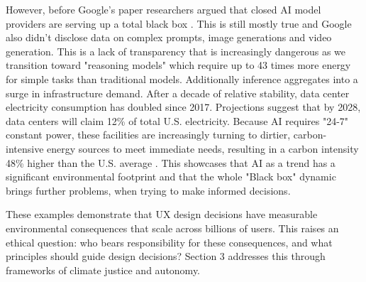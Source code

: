 \par However, before Google's paper researchers argued that closed AI model providers are serving up a total black box . This is still mostly true and Google also didn't disclose data on complex prompts, image generations and video generation. This is a lack of transparency that is increasingly dangerous as we transition toward "reasoning models" which require up to 43 times more energy for simple tasks than traditional models. Additionally inference aggregates into a surge in infrastructure demand. After a decade of relative stability, data center electricity consumption has doubled since 2017. Projections suggest that by 2028, data centers will claim 12\% of total U.S. electricity. Because AI requires "24-7" constant power, these facilities are increasingly turning to dirtier, carbon-intensive energy sources to meet immediate needs, resulting in a carbon intensity 48\% higher than the U.S. average \cite{MIT}. This showcases that AI as a trend has a significant environmental footprint and that the whole "Black box" dynamic brings further problems, when trying to make informed decisions.

\par These examples demonstrate that UX design decisions have measurable environmental
consequences that scale across billions of users. This raises an ethical question:
who bears responsibility for these consequences, and what principles should guide
design decisions? Section 3 addresses this through frameworks of climate justice
and autonomy.
